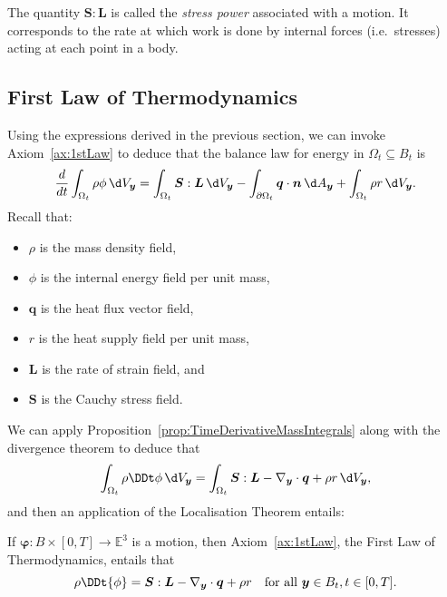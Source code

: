 \documentclass[
  letterpaper,
  DIV=11,
  numbers=noendperiod]{scrreprt}
\theoremstyle{plain}
\theoremstyle{remark}
\begin{document}
The quantity \({\boldsymbol{S}}:{\boldsymbol{L}}\) is called the
\emph{stress power} associated with a motion. It corresponds to the rate
at which work is done by internal forces (i.e.~stresses) acting at each
point in a body.

\subsection{First Law of
Thermodynamics}\label{first-law-of-thermodynamics}

Using the expressions derived in the previous section, we can invoke
Axiom~\hyperref[ax:1stLaw]{{[}ax:1stLaw{]}} to deduce that the balance
law for energy in \(\Omega_t\subseteq B_t\) is
\[\frac{d}{dt}\int_{\Omega_t} \rho\phi{\,\d V_{{\boldsymbol{y}}}}= \int_{\Omega_t}{\boldsymbol{S}}:{\boldsymbol{L}}{\,\d V_{{\boldsymbol{y}}}}-\int_{\partial \Omega_t}{\boldsymbol{q}}\cdot{\boldsymbol{n}}{\,\d A_{{\boldsymbol{y}}}}+\int_{\Omega_t}\rho r{\,\d V_{{\boldsymbol{y}}}}.\]
Recall that:

\begin{itemize}
\item
  \(\rho\) is the mass density field,
\item
  \(\phi\) is the internal energy field per unit mass,
\item
  \({\boldsymbol{q}}\) is the heat flux vector field,
\item
  \(r\) is the heat supply field per unit mass,
\item
  \({\boldsymbol{L}}\) is the rate of strain field, and
\item
  \({\boldsymbol{S}}\) is the Cauchy stress field.
\end{itemize}

We can apply
Proposition~\hyperref[prop:TimeDerivativeMassIntegrals]{{[}prop:TimeDerivativeMassIntegrals{]}}
along with the divergence theorem to deduce that
\[\int_{\Omega_t} \rho\DDt\phi{\,\d V_{{\boldsymbol{y}}}}= \int_{\Omega_t}{\boldsymbol{S}}:{\boldsymbol{L}}-\nabla_{\boldsymbol{y}}\cdot{\boldsymbol{q}}+\rho r{\,\d V_{{\boldsymbol{y}}}},\]
and then an application of the Localisation Theorem entails:

If \({\boldsymbol{\varphi}}:B\times[0,T]\to{\mathbb{E}}^3\) is a motion,
then Axiom~\hyperref[ax:1stLaw]{{[}ax:1stLaw{]}}, the First Law of
Thermodynamics, entails that
\[\rho\DDt{\phi} = {\boldsymbol{S}}:{\boldsymbol{L}}-\nabla_{\boldsymbol{y}}\cdot{\boldsymbol{q}}+ \rho r\quad\text{for all }{\boldsymbol{y}}\in B_t,t\in[0,T].\]
\end{document}
